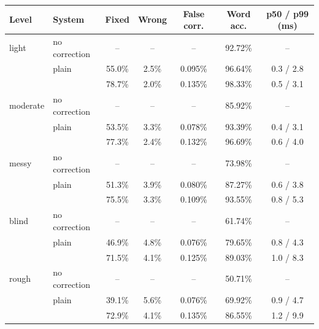 \begin{tabular}{llccccc}
\toprule
Level & System & Fixed & Wrong & False corr. & Word acc. & p50 / p99 (ms) \\
\midrule
light & no correction & -- & -- & -- & 92.72\% & -- \\
 & plain & 55.0\% & 2.5\% & 0.095\% & 96.64\% & 0.3 / 2.8 \\
 & \qk{} & 78.7\% & 2.0\% & 0.135\% & 98.33\% & 0.5 / 3.1 \\
\addlinespace
moderate & no correction & -- & -- & -- & 85.92\% & -- \\
 & plain & 53.5\% & 3.3\% & 0.078\% & 93.39\% & 0.4 / 3.1 \\
 & \qk{} & 77.3\% & 2.4\% & 0.132\% & 96.69\% & 0.6 / 4.0 \\
\addlinespace
messy & no correction & -- & -- & -- & 73.98\% & -- \\
 & plain & 51.3\% & 3.9\% & 0.080\% & 87.27\% & 0.6 / 3.8 \\
 & \qk{} & 75.5\% & 3.3\% & 0.109\% & 93.55\% & 0.8 / 5.3 \\
\addlinespace
blind & no correction & -- & -- & -- & 61.74\% & -- \\
 & plain & 46.9\% & 4.8\% & 0.076\% & 79.65\% & 0.8 / 4.3 \\
 & \qk{} & 71.5\% & 4.1\% & 0.125\% & 89.03\% & 1.0 / 8.3 \\
\addlinespace
rough & no correction & -- & -- & -- & 50.71\% & -- \\
 & plain & 39.1\% & 5.6\% & 0.076\% & 69.92\% & 0.9 / 4.7 \\
 & \qk{} & 72.9\% & 4.1\% & 0.135\% & 86.55\% & 1.2 / 9.9 \\
\bottomrule
\end{tabular}
